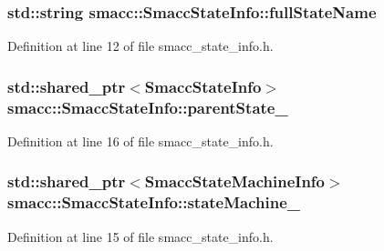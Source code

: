 \subsubsection[{\texorpdfstring{full\+State\+Name}{fullStateName}}]{\setlength{\rightskip}{0pt plus 5cm}std\+::string smacc\+::\+Smacc\+State\+Info\+::full\+State\+Name}\hypertarget{classsmacc_1_1SmaccStateInfo_a3d9d81ebeda351fba21665bb7b9ff148}{}\label{classsmacc_1_1SmaccStateInfo_a3d9d81ebeda351fba21665bb7b9ff148}


Definition at line 12 of file smacc\+\_\+state\+\_\+info.\+h.

\subsubsection[{\texorpdfstring{parent\+State\+\_\+}{parentState_}}]{\setlength{\rightskip}{0pt plus 5cm}std\+::shared\+\_\+ptr$<${\bf Smacc\+State\+Info}$>$ smacc\+::\+Smacc\+State\+Info\+::parent\+State\+\_\+}\hypertarget{classsmacc_1_1SmaccStateInfo_ae19f4efbeb2ca665b320df80766d9209}{}\label{classsmacc_1_1SmaccStateInfo_ae19f4efbeb2ca665b320df80766d9209}


Definition at line 16 of file smacc\+\_\+state\+\_\+info.\+h.

\subsubsection[{\texorpdfstring{state\+Machine\+\_\+}{stateMachine_}}]{\setlength{\rightskip}{0pt plus 5cm}std\+::shared\+\_\+ptr$<${\bf Smacc\+State\+Machine\+Info}$>$ smacc\+::\+Smacc\+State\+Info\+::state\+Machine\+\_\+}\hypertarget{classsmacc_1_1SmaccStateInfo_af9884b3fda41fbc87abf9908b8bd72e7}{}\label{classsmacc_1_1SmaccStateInfo_af9884b3fda41fbc87abf9908b8bd72e7}


Definition at line 15 of file smacc\+\_\+state\+\_\+info.\+h.

